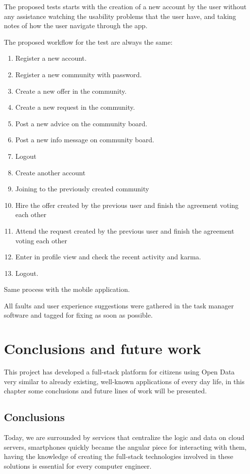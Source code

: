 \documentclass{DeustoFDP}
\begin{document}
The proposed tests starts with the creation of a new account by the user without any assistance watching the usability problems that the user have, and taking notes of how the user navigate through the app.

The proposed workflow for the test are always the same:

\begin{enumerate}
	\item Register a new account.
	\item Register a new community with password.
	\item Create a new offer in the community.
	\item Create a new request in the community.
	\item Post a new advice on the community board.
	\item Post a new info message on community board.
	\item Logout
	\item Create another account
	\item Joining to the previously created community
	\item Hire the offer created by the previous user and finish the agreement voting each other
	\item Attend the request created by the previous user and finish the agreement voting each other
	\item Enter in profile view and check the recent activity and karma.
	\item Logout.
\end{enumerate}

Same process with the mobile application.

All faults and user experience suggestions were gathered in the task manager software and tagged for fixing as soon as possible.

\chapter{Conclusions and future work}\label{cha:conclusions}
This project has developed a full-stack platform for citizens using Open Data very similar to already existing, well-known applications of every day life, in this chapter some conclusions and future lines of work will be presented.

\section{Conclusions}
Today, we are surrounded by services that centralize the logic and data on cloud servers, smartphones quickly became the angular piece for interacting with them, having the knowledge of creating the full-stack technologies involved in these solutions is essential for every computer engineer.
\end{document}
